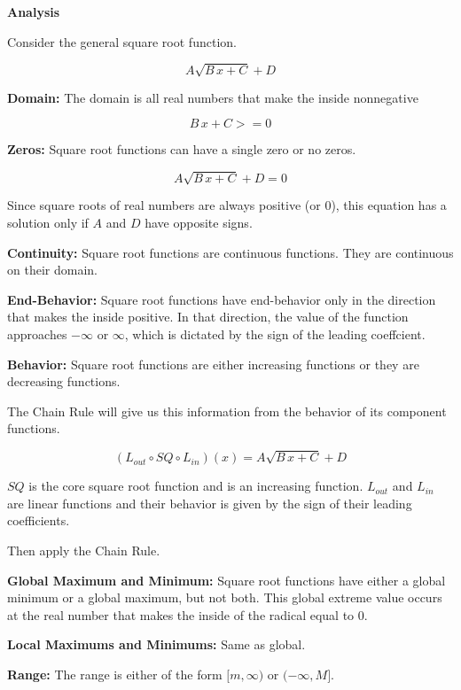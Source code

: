 \documentclass{ximera}
\begin{document}
\begin{summary} \textbf{\textcolor{red!70!yellow}{Analysis}}


Consider the general square root function.

\[  A \sqrt{B \,x + C} + D  \]


\textbf{Domain:} The domain is all real numbers that make the inside nonnegative


\[ B \,x + C >= 0 \]


\textbf{Zeros:} Square root functions can have a single zero or no zeros.


\[  A \sqrt{B \,x + C} + D  = 0 \]

Since square roots of real numbers are always positive (or $0$), this equation has a solution only if $A$ and $D$ have opposite signs.


\textbf{Continuity:} Square root functions are continuous functions.  They are continuous on their domain.



\textbf{End-Behavior:} Square root functions have end-behavior only in the direction that makes the inside positive. In that direction, the value of the function approaches $-\infty$ or $\infty$, which is dictated by the sign of the leading coeffcient.



\textbf{Behavior:} Square root functions are either increasing functions or they are decreasing functions.  

The Chain Rule will give us this information from the behavior of its component functions.


\[
(L_{out} \circ SQ \circ L_{in})(x) = A \sqrt{B \,x + C} + D
\]


$SQ$ is the core square root function and is an increasing function.  $L_{out}$ and $L_{in}$ are linear functions and their behavior is given by the sign of their leading coefficients.

Then apply the Chain Rule.



\textbf{Global Maximum and Minimum:}  Square root functions have either a global minimum or a global maximum, but not both. This global extreme value occurs at the real number that makes the inside of the radical equal to $0$.


\textbf{Local Maximums and Minimums:} Same as global.


\textbf{Range:} The range is either of the form $[m, \infty)$ or $(-\infty, M]$.

\end{summary}
\end{document}
